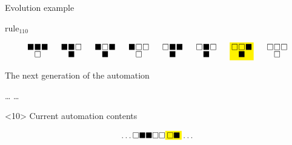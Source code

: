 \documentclass[presentation,aspectratio=169,smaller]{beamer}
\begin{document}
\begin{frame}[label={sec:org3545853},t]{Evolution example}
\begin{onlyenv}
\(\text{rule}_{110}\)

\begin{equation*}
  \begingroup
  \setlength\arraycolsep{0.25pt}
  \renewcommand{\arraystretch}{0.5}
  \begin{matrix}
    \blacksquare & \blacksquare & \blacksquare \\
    & \square &
  \end{matrix}\mspace{28mu}
  \begin{matrix}
    \blacksquare & \blacksquare & \square \\
    & \blacksquare &
  \end{matrix}\mspace{28mu}
  \begin{matrix}
    \blacksquare & \square & \blacksquare \\
    & \blacksquare &
  \end{matrix}\mspace{28mu}
  \begin{matrix}
    \blacksquare & \square & \square \\
    & \square &
  \end{matrix}\mspace{28mu}
  \begin{matrix}
    \square & \blacksquare & \blacksquare \\
    & \blacksquare &
  \end{matrix}\mspace{28mu}
  \begin{matrix}
    \square & \blacksquare & \square \\
    & \blacksquare &
  \end{matrix}\mspace{28mu}
  \mathcolorbox{yellow}{
    \begin{matrix}
      \square & \square & \blacksquare \\
      & \blacksquare &
    \end{matrix}
  }\mspace{28mu}
  \begin{matrix}
    \square & \square & \square \\
    & \square &
  \end{matrix}
  \endgroup
\end{equation*}

The next generation of the automation

\hfill \dots
\blacksquare
\blacksquare
\blacksquare
\square
\square
{}
\mspace{14mu}
\dots \hfill
\end{onlyenv}

\begin{onlyenv}<10>
Current automation contents

\begin{equation*}
  \hfill
  \dots
  \square
  \blacksquare
  \blacksquare
  \square
  \square
  \mathcolorbox{yellow}{
    \square
    \blacksquare
  }
  \dots
  \hfill
\end{equation*}


\end{onlyenv}
\end{frame}
\end{document}
